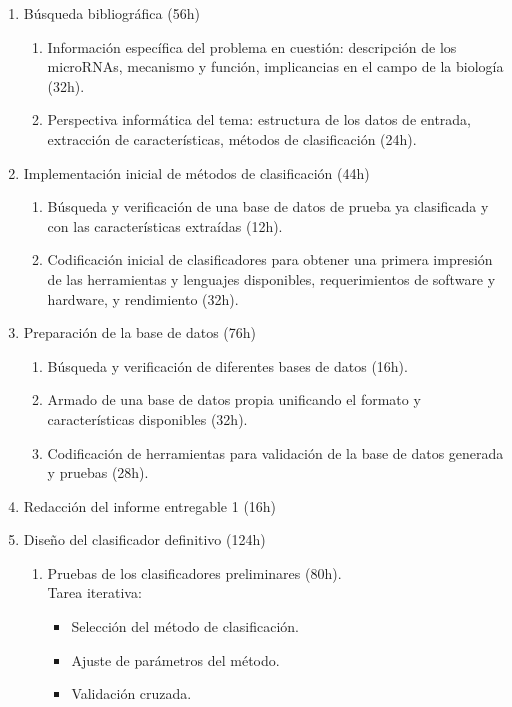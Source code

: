 \documentclass[12pt,bibliography=oldstyle,DIV=12,parskip=full-,titlepage]{scrartcl}
\begin{document}
\begin{enumerate}
\item Búsqueda bibliográfica (56h)
  \begin{enumerate}
  \item Información específica del problema en cuestión: descripción
    de los microRNAs, mecanismo y función, implicancias en el campo de
    la biología (32h).
  \item Perspectiva informática del tema: estructura de los datos de
    entrada, extracción de características, métodos de clasificación
    (24h).
  \end{enumerate}
\item Implementación inicial de métodos de clasificación (44h)
  \begin{enumerate}
  \item Búsqueda y verificación de una base de datos de prueba ya
    clasificada y con las características extraídas (12h).
  \item Codificación inicial de clasificadores para obtener una
    primera impresión de las herramientas y lenguajes disponibles,
    requerimientos de software y hardware, y rendimiento (32h).
  \end{enumerate}
\item Preparación de la base de datos (76h)
  \begin{enumerate}
  \item Búsqueda y verificación de diferentes bases de datos (16h).
  \item Armado de una base de datos propia unificando el formato y
    características disponibles (32h).
  \item Codificación de herramientas para validación de la base de
    datos generada y pruebas (28h).
  \end{enumerate}
\item Redacción del informe entregable 1 (16h)
\item Diseño del clasificador definitivo (124h)
  \begin{enumerate}
  \item Pruebas de los clasificadores preliminares (80h).\\
    Tarea iterativa:
    \begin{itemize}
    \item Selección del método de clasificación.
    \item Ajuste de parámetros del método.
    \item Validación cruzada.
    \end{itemize}

\end{enumerate}
\end{enumerate}
\end{document}
